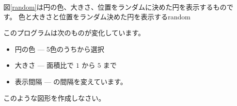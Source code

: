 \iffalse\else
\begin{Problem}\upshape\label{prob-random}
図\ref{random}は円の色、大きさ、位置をランダムに決めた円を表示するもので
 す。
{色と大きさと位置をランダム決めた円を表示する}{random}

このプログラムは次のものが変化しています。
\begin{itemize}\upshape
 \item 円の色 --- 5色のうちから選択
 \item 大きさ --- 面積比で $1$ から $5$ まで
 \item 表示間隔 --- の間隔を変えています。
\end{itemize}
このような図形を作成しなさい。
\end{Problem}
\fi